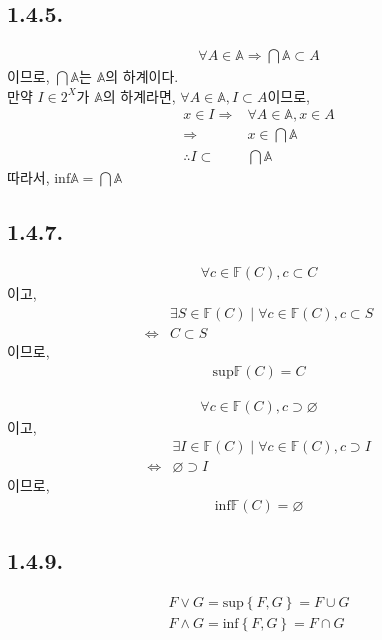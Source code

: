 \documentclass{article}
\begin{document}
\subsection{1.4.5.}
\begin{align*}
\forall A \in \mathbb{A} \Rightarrow \bigcap \mathbb{A} \subset A
\end{align*}
이므로, $\bigcap \mathbb{A}$는 $\mathbb{A}$의 하계이다.
\\ 만약 $I \in 2^{X}$가 $\mathbb{A}$의 하계라면, $\forall A \in \mathbb{A}, I \subset A$이므로,
\begin{align*}
x \in I \Rightarrow& \forall A \in \mathbb{A}, x \in A
\\ \Rightarrow& x \in \bigcap \mathbb{A}
\\ \therefore I \subset& \bigcap \mathbb{A}
\end{align*}
따라서, $\text{inf} \mathbb{A} = \bigcap \mathbb{A}$


\subsection{1.4.7.}
\begin{align*}
\forall c \in \mathbb{F}(C), c \subset C
\end{align*}이고,
\begin{align*}
&\exists S \in \mathbb{F}(C) \mid \forall c \in \mathbb{F}(C), c \subset S
\\ \iff& C \subset S
\end{align*}이므로,
\begin{align*}
\text{sup} \mathbb{F}(C) = C
\end{align*}

\begin{align*}
\forall c \in \mathbb{F}(C), c \supset \varnothing
\end{align*}이고,
\begin{align*}
&\exists I \in \mathbb{F}(C) \mid \forall c \in \mathbb{F}(C), c \supset I
\\ \iff&  \varnothing \supset I
\end{align*}이므로,
\begin{align*}
\text{inf} \mathbb{F}(C) = \varnothing
\end{align*}

\subsection{1.4.9.}
\begin{align*}
F \vee G = \text{sup}\left\{F, G\right\} =  F \cup G
\\ F \wedge G = \text{inf}\left\{F, G\right\}  = F \cap G
\end{align*}
\end{document}
